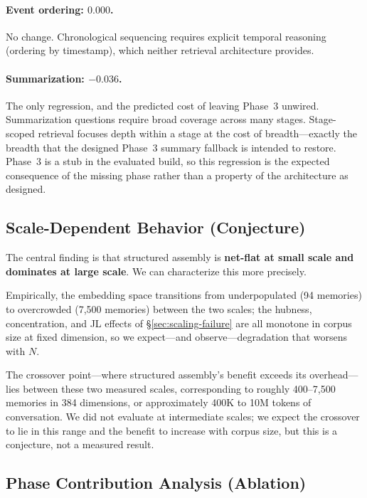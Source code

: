 \documentclass[11pt]{article}
\begin{document}
\paragraph{Event ordering: $0.000$.}
No change.  Chronological sequencing requires explicit temporal
reasoning (ordering by timestamp), which neither retrieval
architecture provides.

\paragraph{Summarization: $-0.036$.}
The only regression, and the predicted cost of leaving Phase~3
unwired.  Summarization questions require broad coverage
across many stages.  Stage-scoped retrieval focuses depth within a
stage at the cost of breadth---exactly the breadth that the designed
Phase~3 summary fallback is intended to restore.  Phase~3 is a stub
in the evaluated build, so this regression is the expected consequence
of the missing phase rather than a property of the architecture as
designed.

\subsection{Scale-Dependent Behavior (Conjecture)}
\label{sec:scale-dependent}

The central finding is that structured assembly is \textbf{net-flat at
small scale and dominates at large scale}.  We can characterize this
more precisely.

Empirically, the embedding space transitions from underpopulated
(94 memories) to overcrowded (7,500 memories) between the two scales;
the hubness, concentration, and JL effects of \S\ref{sec:scaling-failure}
are all monotone in corpus size at fixed dimension, so we expect---and
observe---degradation that worsens with $N$.

The crossover point---where structured assembly's benefit exceeds its
overhead---lies between these two measured scales, corresponding to
roughly 400--7,500 memories in 384 dimensions, or approximately 400K
to 10M tokens of conversation.  We did not evaluate at intermediate
scales; we expect the crossover to lie in this range and the benefit
to increase with corpus size, but this is a conjecture, not a measured
result.

\subsection{Phase Contribution Analysis (Ablation)}
\label{sec:ablation}
\end{document}
